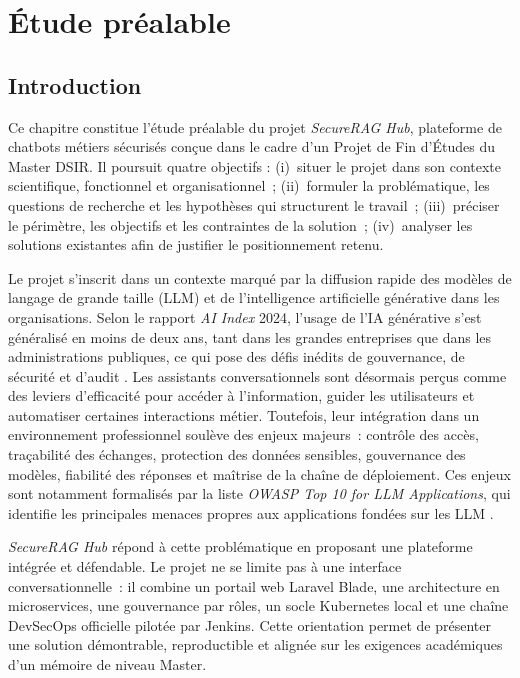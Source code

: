 \chapter{Étude préalable}
\fancyhead[L]{\leftmark}

\section{Introduction}

Ce chapitre constitue l'étude préalable du projet \textit{SecureRAG Hub}, plateforme de chatbots métiers sécurisés conçue dans le cadre d'un Projet de Fin d'Études du Master DSIR. Il poursuit quatre objectifs : (i)~situer le projet dans son contexte scientifique, fonctionnel et organisationnel~; (ii)~formuler la problématique, les questions de recherche et les hypothèses qui structurent le travail~; (iii)~préciser le périmètre, les objectifs et les contraintes de la solution~; (iv)~analyser les solutions existantes afin de justifier le positionnement retenu.

Le projet s'inscrit dans un contexte marqué par la diffusion rapide des modèles de langage de grande taille (LLM) et de l'intelligence artificielle générative dans les organisations. Selon le rapport \textit{AI Index} 2024, l'usage de l'IA générative s'est généralisé en moins de deux ans, tant dans les grandes entreprises que dans les administrations publiques, ce qui pose des défis inédits de gouvernance, de sécurité et d'audit \cite{stanford_ai_index_2024}. Les assistants conversationnels sont désormais perçus comme des leviers d'efficacité pour accéder à l'information, guider les utilisateurs et automatiser certaines interactions métier. Toutefois, leur intégration dans un environnement professionnel soulève des enjeux majeurs~: contrôle des accès, traçabilité des échanges, protection des données sensibles, gouvernance des modèles, fiabilité des réponses et maîtrise de la chaîne de déploiement. Ces enjeux sont notamment formalisés par la liste \textit{OWASP Top 10 for LLM Applications}, qui identifie les principales menaces propres aux applications fondées sur les LLM \cite{owasp_llm_top10}.

\textit{SecureRAG Hub} répond à cette problématique en proposant une plateforme intégrée et défendable. Le projet ne se limite pas à une interface conversationnelle~: il combine un portail web Laravel Blade, une architecture en microservices, une gouvernance par rôles, un socle Kubernetes local et une chaîne DevSecOps officielle pilotée par Jenkins. Cette orientation permet de présenter une solution démontrable, reproductible et alignée sur les exigences académiques d'un mémoire de niveau Master.

